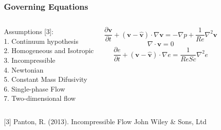 \begin{frame} 
 \frametitle{\LARGE Governing Equations}
\vspace{-1.2cm}
\begin{columns}[c]
Assumptions [3]:\\[0.1cm]
\hspace{0.5cm}  1. Continuum hypothesis\\[0.1cm]
\hspace{0.5cm}  2. Homogeneous and Isotropic\\[0.1cm]
\hspace{0.5cm}  3. Incompressible\\[0.1cm]
\hspace{0.5cm}  4. Newtonian\\[0.1cm]
\hspace{0.5cm}  5. Constant Mass Difusivity\\[0.1cm]
\hspace{0.5cm}  6. Single-phase Flow\\[0.1cm]
\hspace{0.5cm}  7. Two-dimensional flow

\vspace{-1cm}
\begin{center}
\begin{equation*}
 \frac{\partial \textbf{v}}{\partial t} + \left( \mathbf{v} - \mathbf{\hat{v}} \right) \cdot \nabla \textbf{v} = -\nabla p + \frac{1}{Re} \nabla^{2} \textbf{v}
\end{equation*}
\medskip
\begin{equation*}
 \nabla \cdot \textbf{v} = 0
\end{equation*}
\medskip
\begin{equation*}
 \frac{\partial e}{\partial t} + \left( \mathbf{v} - \mathbf{\hat{v}} \right) \cdot \nabla e = \frac{1}{ReSc} \nabla^{2} e
\end{equation*}
\end{center}
\end{columns}

\vspace{1cm}

\vspace{0.5cm}
\tiny [3]
Panton, R. (2013). Incompressible Flow John Wiley \& Sons, Ltd


\end{frame}



